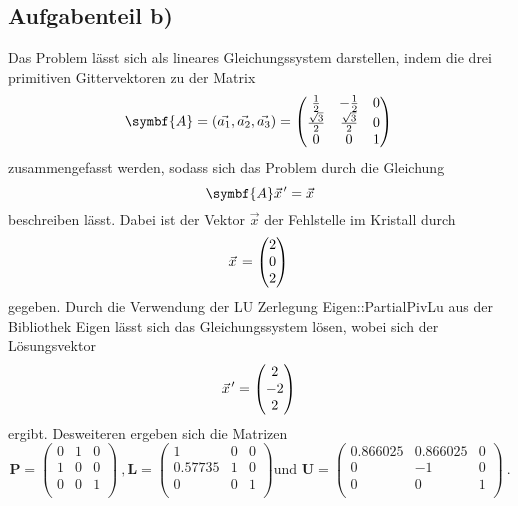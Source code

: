 \subsection*{Aufgabenteil b)}
Das Problem lässt sich als lineares Gleichungssystem darstellen, indem die drei primitiven Gittervektoren zu
der Matrix
\begin{equation}
  \symbf{A}=(\vec{a_1},\vec{a_2},\vec{a_3})=
  \begin{pmatrix}
    \frac{1}{2} & -\frac{1}{2} & 0 \\
    \frac{\sqrt{3}}{2} & \frac{\sqrt{3}}{2} & 0 \\
    0 & 0 & 1 \\
  \end{pmatrix} \\
\end{equation}
zusammengefasst werden, sodass sich das Problem durch die Gleichung
\begin{equation}
  \symbf{A}\pvec{x}'=\vec{x}
  \label{eqn:gitter}
\end{equation}
beschreiben lässt.
Dabei ist der Vektor $\vec{x}$ der Fehlstelle im Kristall durch
\begin{equation*}
  \pvec{x}=
  \begin{pmatrix}
    2 \\
    0 \\
    2 \\
  \end{pmatrix} \\
\end{equation*}
gegeben.
Durch die Verwendung der LU Zerlegung Eigen::PartialPivLu aus der Bibliothek Eigen lässt sich das Gleichungssystem lösen, wobei sich der Lösungsvektor
\begin{equation*}
  \pvec{x}'=
  \begin{pmatrix}
    2 \\
    -2 \\
    2 \\
  \end{pmatrix} \\
\end{equation*}
ergibt. Desweiteren ergeben sich die Matrizen
\begin{equation*}
  \symbf{P}=
  \begin{pmatrix}
    0 & 1 & 0 \\
    1 & 0 & 0 \\
    0 & 0 & 1 \\
  \end{pmatrix} \: ,
  \symbf{L}=
  \begin{pmatrix}
    1 & 0 & 0 \\
    0.57735 & 1 & 0 \\
    0 & 0 & 1 \\
  \end{pmatrix}
  \text{und }
  \symbf{U}=
  \begin{pmatrix}
    0.866025 & 0.866025 & 0 \\
    0 & -1 & 0 \\
    0 & 0 & 1 \\
  \end{pmatrix} \: .
\end{equation*}


